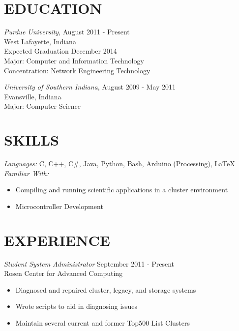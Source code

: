 \documentclass[line,margin]{res}
\begin{document}
\name{\textcolor{OliveGreen}{Ethan Madden}}
\address{maddene@purdue.edu}
\address{(812) 250-1419}
 
\begin{resume}
\section{\textcolor{OliveGreen}{EDUCATION}} 

				{\sl Purdue University}, \hfill August 2011 - Present \\
                West Lafayette, Indiana \\
                Expected Graduation December 2014 \\
                Major: Computer and Information Technology \\
                Concentration: Network Engineering Technology 
                
        {\sl University of Southern Indiana}, \hfill August 2009 - May 2011 \\
                Evansville, Indiana \\
                Major: Computer Science
                
 
\section{\textcolor{OliveGreen}{SKILLS}} 
				{\sl Languages:}  C, C++, C\#, Java, Python, Bash, Arduino (Processing), \LaTeX \\
				{\sl Familiar With:} 
                \begin{itemize} \itemsep -2pt %
                  \item Compiling and running scientific applications in a cluster environment
                  \item Microcontroller Development
                \end{itemize}
 
\section{\textcolor{OliveGreen}{EXPERIENCE}} 
				{\sl Student System Administrator} \hfill September 2011 - Present \\
                Rosen Center for Advanced Computing
                \begin{itemize}  \itemsep -2pt %
                  \item Diagnosed and repaired cluster, legacy, and storage systems
                  \item Wrote scripts to aid in diagnosing issues
                  \item Maintain several current and former Top500 List Clusters
                \end{itemize}


\end{resume}
\end{document}
